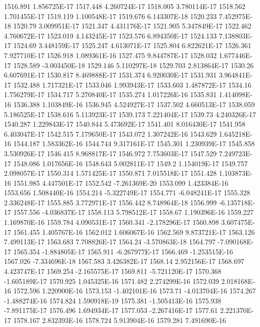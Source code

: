 1516.891  1.856725E-17
1517.448  4.260724E-17
1518.005  3.780114E-17
1518.562  1.701455E-17
1519.119  1.100548E-17
1519.676  6.143307E-18
1520.233  7.452975E-18
1520.79  3.009951E-17
1521.347  4.431176E-17
1521.905  5.347849E-17
1522.462  4.760672E-17
1523.019  4.143245E-17
1523.576  6.894350E-17
1524.133  7.138803E-17
1524.69  3.448159E-17
1525.247  4.613071E-17
1525.804  6.822621E-17
1526.361  7.927710E-17
1526.918  1.089361E-16
1527.475  9.844787E-17
1528.032  1.677446E-17
1528.589  -3.003450E-18
1529.146  5.110297E-18
1529.703  2.813864E-17
1530.26  6.607691E-17
1530.817  8.469888E-17
1531.374  6.920030E-17
1531.931  3.964841E-17
1532.488  1.717321E-17
1533.046  1.993943E-17
1533.603  1.487872E-17
1534.16  1.756279E-17
1534.717  5.270840E-17
1535.274  1.017226E-16
1535.831  1.414098E-16
1536.388  1.103849E-16
1536.945  4.524927E-17
1537.502  4.660513E-17
1538.059  5.186525E-17
1538.616  5.113923E-17
1539.173  7.221404E-17
1539.73  4.240326E-17
1540.287  1.229843E-17
1540.844  5.473692E-17
1541.401  8.016430E-17
1541.958  6.403047E-17
1542.515  7.179650E-17
1543.072  1.307242E-16
1543.629  1.645218E-16
1544.187  1.583362E-16
1544.744  9.317161E-17
1545.301  1.230939E-17
1545.858  3.530926E-17
1546.415  8.968817E-17
1546.972  7.753603E-17
1547.529  7.249723E-17
1548.086  1.017656E-16
1548.643  5.002811E-17
1549.2  1.154019E-17
1549.757  2.098057E-17
1550.314  1.571425E-17
1550.871  7.015518E-17
1551.428  1.103873E-16
1551.985  4.447501E-17
1552.542  -7.261369E-20
1553.099  1.423384E-16
1553.656  1.508440E-16
1554.214  -5.322749E-17
1554.771  -6.048241E-17
1555.328  2.336248E-17
1555.885  3.772971E-17
1556.442  8.748964E-18
1556.999  -6.135718E-17
1557.556  -4.036837E-17
1558.113  5.798512E-17
1558.67  1.190396E-16
1559.227  1.169870E-16
1559.784  4.090531E-17
1560.341  -2.178296E-17
1560.898  3.607475E-17
1561.455  1.405767E-16
1562.012  1.606067E-16
1562.569  9.873721E-17
1563.126  7.499113E-17
1563.683  7.708826E-17
1564.24  -3.570863E-18
1564.797  -7.090168E-17
1565.354  -1.884805E-17
1565.911  -6.267977E-17
1566.469  -1.253515E-16
1567.026  -7.334696E-18
1567.583  3.426382E-17
1568.14  2.952156E-17
1568.697  4.423747E-17
1569.254  -2.165575E-17
1569.811  -5.721120E-17
1570.368  -1.605189E-17
1570.925  1.045325E-16
1571.482  2.274299E-16
1572.039  2.018168E-16
1572.596  1.220900E-16
1573.153  -1.402101E-16
1573.71  -4.013704E-16
1574.267  -1.488274E-16
1574.824  1.590918E-19
1575.381  -1.505413E-16
1575.938  -7.891175E-17
1576.496  1.694934E-17
1577.053  -2.267416E-17
1577.61  2.221370E-17
1578.167  2.832393E-16
1578.724  5.913904E-16
1579.281  7.491690E-16
